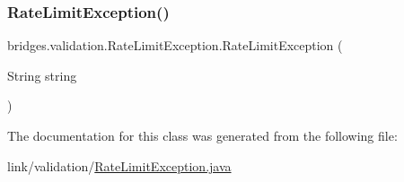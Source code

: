 \subsubsection{\texorpdfstring{Rate\+Limit\+Exception()}{RateLimitException()}}
{\footnotesize\ttfamily bridges.\+validation.\+Rate\+Limit\+Exception.\+Rate\+Limit\+Exception (\begin{DoxyParamCaption}\item[{String}]{string }\end{DoxyParamCaption})}



The documentation for this class was generated from the following file\+:\begin{DoxyCompactItemize}
\item 
link/validation/\hyperlink{_rate_limit_exception_8java}{Rate\+Limit\+Exception.\+java}\end{DoxyCompactItemize}
